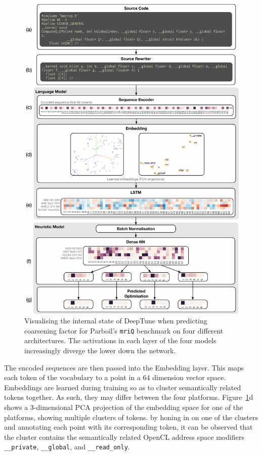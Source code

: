 \begin{figure}
  \centering %
  \includegraphics[width=\textwidth]{img/viz}%
  \caption[Visualising the internal state of DeepTune]{%
    Visualising the internal state of DeepTune when predicting coarsening factor
    for Parboil's \texttt{mriQ} benchmark on four different architectures. The
    activations in each layer of the four models increasingly diverge the lower
    down the network.%
  }
  \label{fig:viz} %
\end{figure}

The encoded sequences are then passed into the Embedding layer. This maps each token of the vocabulary to a point in a 64 dimension vector space. Embeddings are learned during training so as to cluster semantically related tokens together. As such, they may differ between the four platforms. Figure~\ref{fig:viz}d shows a 3-dimensional PCA projection of the embedding space for one of the platforms, showing multiple clusters of tokens.  by honing in on one of the clusters and annotating each point with its corresponding token, it can be observed that the cluster contains the semantically related OpenCL address space modifiers \texttt{\_\_private}, \texttt{\_\_global}, and \texttt{\_\_read\_only}.

